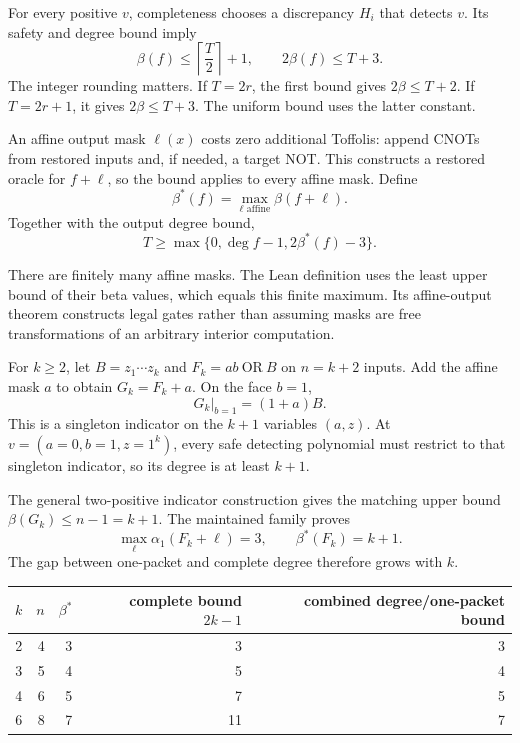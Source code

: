 For every positive $v$, completeness chooses a discrepancy $H_i$ that
detects $v$. Its safety and degree bound imply
\[
 \beta(f)\le\left\lceil\frac T2\right\rceil+1,
 \qquad 2\beta(f)\le T+3.
\]
The integer rounding matters. If $T=2r$, the first bound gives
$2\beta\le T+2$. If $T=2r+1$, it gives $2\beta\le T+3$.
The uniform bound uses the latter constant.

An affine output mask $\ell(x)$ costs zero additional Toffolis: append
CNOTs from restored inputs and, if needed, a target NOT. This constructs
a restored oracle for $f+\ell$, so the bound applies to every affine mask.
Define
\[
 \beta^*(f)=\max_{\ell\text{ affine}}\beta(f+\ell).
\]
Together with the output degree bound,
\[
 \boxed{T\ge\max\{0,\deg f-1,2\beta^*(f)-3\}.}
\]

There are finitely many affine masks. The Lean definition uses the least
upper bound of their beta values, which equals this finite maximum. Its
affine-output theorem constructs legal gates rather than assuming masks
are free transformations of an arbitrary interior computation.


For $k\ge2$, let $B=z_1\cdots z_k$ and $F_k=ab\ \mathrm{OR}\ B$ on
$n=k+2$ inputs. Add the affine mask $a$ to obtain $G_k=F_k+a$.
On the face $b=1$,
\[
 G_k|_{b=1}=(1+a)B.
\]
This is a singleton indicator on the $k+1$ variables $(a,z)$.
At $v=(a=0,b=1,z=1^k)$, every safe detecting polynomial must restrict to
that singleton indicator, so its degree is at least $k+1$.

The general two-positive indicator construction gives the matching upper
bound $\beta(G_k)\le n-1=k+1$. The maintained family proves
\[
 \max_\ell\alpha_1(F_k+\ell)=3,\qquad \beta^*(F_k)=k+1.
\]
The gap between one-packet and complete degree therefore grows with $k$.

\begin{center}
\begin{tabular}{@{}rrrrr@{}}\toprule
$k$ & $n$ & $\beta^*$ & complete bound $2k-1$ & combined degree/one-packet bound\\\midrule
2 & 4 & 3 & 3 & 3\\
3 & 5 & 4 & 5 & 4\\
4 & 6 & 5 & 7 & 5\\
6 & 8 & 7 & 11 & 7\\\bottomrule
\end{tabular}
\end{center}

